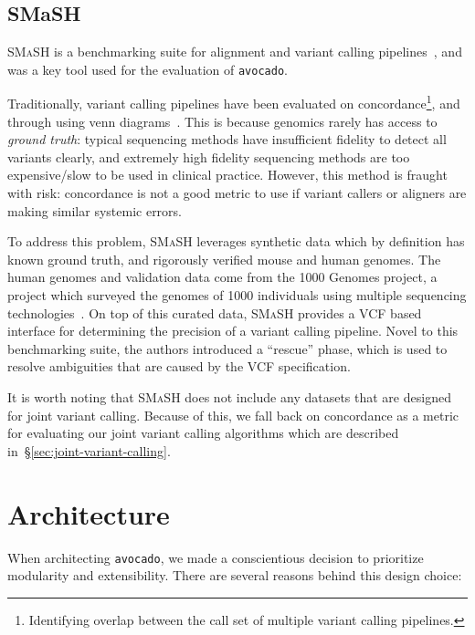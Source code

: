 \documentclass{acm_proc_article-sp}
\begin{document}
\subsection{SMaSH}
\label{sec:smash}


\textsc{SMaSH} is a benchmarking suite for alignment and variant calling pipelines~\cite{talwalkar13}, and was a key tool used for the
evaluation of \texttt{avocado}.

Traditionally, variant calling pipelines have been evaluated on concordance\footnote{Identifying overlap between the call set of multiple
variant calling pipelines.}, and through using venn diagrams~\cite{tao13}. This is because genomics rarely has access to \emph{ground
truth}: typical sequencing methods have insufficient fidelity to detect all variants clearly, and extremely high fidelity sequencing methods
are too expensive/slow to be used in clinical practice. However, this method is fraught with risk: concordance is not a good metric to use if
variant callers or aligners are making similar systemic errors.

To address this problem, \textsc{SMaSH} leverages synthetic data which by definition has known ground truth, and rigorously verified
mouse and human genomes. The human genomes and validation data come from the 1000 Genomes project, a project which surveyed
the genomes of 1000 individuals using multiple sequencing technologies~\cite{siva08}. On top of this curated data, \textsc{SMaSH}
provides a VCF based interface for determining the precision of a variant calling pipeline. Novel to this benchmarking suite, the authors
introduced a ``rescue'' phase, which is used to resolve ambiguities that are caused by the VCF specification.

It is worth noting that \textsc{SMaSH} does not include any datasets that are designed for joint variant calling. Because of this, we fall back
on concordance as a metric for evaluating our joint variant calling algorithms which are described in~\S\ref{sec:joint-variant-calling}.

\section{Architecture}
\label{sec:architecture}


When architecting \texttt{avocado}, we made a conscientious decision to prioritize modularity and extensibility. There are several reasons
behind this design choice:
\end{document}
